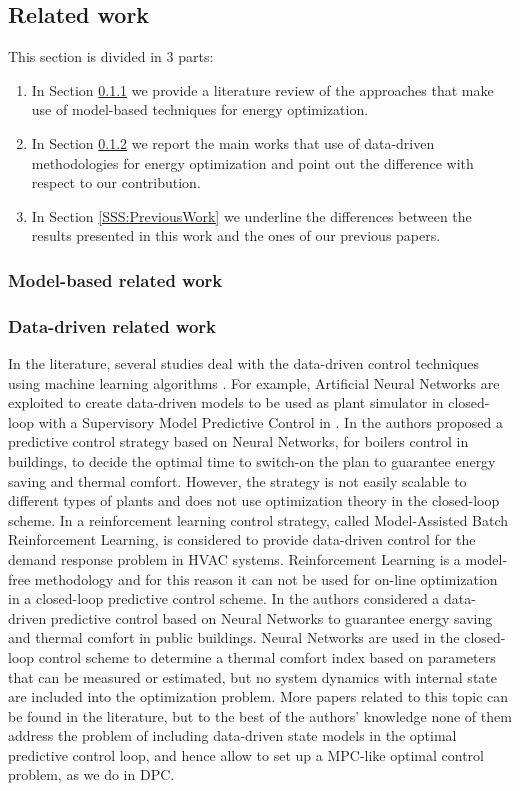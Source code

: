 \textcolor[rgb]{0,0,1}{
\subsection{Related work}
This section is divided in 3 parts:
\begin{enumerate}
	\item In Section \ref{SSS:ModelBasedWork} we provide a literature review of the approaches that make use of model-based techniques for energy optimization.
	\item In Section \ref{SSS:DataDrivenWork} we report the main works that use of data-driven methodologies for energy optimization and point out the difference with respect to our contribution.
	\item In Section \ref{SSS:PreviousWork} we underline the differences between the results presented in this work and the ones of our previous papers.
\end{enumerate}
\subsubsection{Model-based related work}\label{SSS:ModelBasedWork}
\subsubsection{Data-driven related work}\label{SSS:DataDrivenWork}}
In the literature, several studies deal with the data-driven control techniques using machine learning algorithms \cite{Hou2013}. For example, Artificial Neural Networks are exploited to create data-driven models to be used as plant simulator in closed-loop with a Supervisory Model Predictive Control in \cite{Afram2017}. In \cite{Macarulla2017} the authors proposed a predictive control strategy based on Neural Networks, for boilers control in buildings, to decide the optimal time to switch-on the plan to guarantee energy saving and thermal comfort. However, the strategy is not easily scalable to different types of plants and does not use optimization theory in the closed-loop scheme. In \cite{Costanzo2016} a reinforcement learning control strategy, called Model-Assisted Batch Reinforcement Learning, is considered to provide data-driven control for the demand response problem in HVAC systems. Reinforcement Learning is a model-free methodology and for this reason it can not be used for on-line optimization in a closed-loop predictive control scheme. In \cite{Ferreira2012} the authors considered a data-driven predictive control based on Neural Networks to guarantee energy saving and  thermal comfort in public buildings. Neural Networks are used in the closed-loop control scheme to determine a thermal comfort index based on parameters that can be measured or estimated, but no  system dynamics with internal state are included into the optimization problem. More papers related to this topic can be found in the literature, but to the best of the authors' knowledge none of them address the problem of including data-driven state models in the optimal predictive control loop, and hence allow to set up a MPC-like optimal control problem, as we do in DPC.

